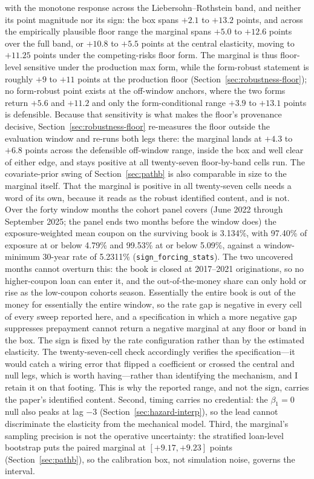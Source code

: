 \documentclass[12pt]{article}
\begin{document}
with the monotone response across the Liebersohn--Rothstein band, and neither its point magnitude nor its sign: the box spans $+2.1$ to $+13.2$ points, and across the empirically plausible floor range the marginal spans $+5.0$ to $+12.6$ points over the full band, or $+10.8$ to $+5.5$ points at the central elasticity, moving to $+11.25$ points under the competing-risks floor form. The marginal is thus floor-level sensitive under the production max form, while the form-robust statement is roughly $+9$ to $+11$ points at the production floor (Section~\ref{sec:robustness-floor}); no form-robust point exists at the off-window anchors, where the two forms return $+5.6$ and $+11.2$ and only the form-conditional range $+3.9$ to $+13.1$ points is defensible. Because that sensitivity is what makes the floor's provenance decisive, Section~\ref{sec:robustness-floor} re-measures the floor outside the evaluation window and re-runs both legs there: the marginal lands at $+4.3$ to $+6.8$ points across the defensible off-window range, inside the box and well clear of either edge, and stays positive at all twenty-seven floor-by-band cells run. The covariate-prior swing of Section~\ref{sec:pathb} is also comparable in size to the marginal itself. That the marginal is positive in all twenty-seven cells needs a word of its own, because it reads as the robust identified content, and is not. Over the forty window months the cohort panel covers (June 2022 through September 2025; the panel ends two months before the window does) the exposure-weighted mean coupon on the surviving book is 3.134\%, with 97.40\% of exposure at or below 4.79\% and 99.53\% at or below 5.09\%, against a window-minimum 30-year rate of 5.2311\% (\texttt{sign\_forcing\_stats}). The two uncovered months cannot overturn this: the book is closed at 2017--2021 originations, so no higher-coupon loan can enter it, and the out-of-the-money share can only hold or rise as the low-coupon cohorts season. Essentially the entire book is out of the money for essentially the entire window, so the rate gap is negative in every cell of every sweep reported here, and a specification in which a more negative gap suppresses prepayment cannot return a negative marginal at any floor or band in the box. The sign is fixed by the rate configuration rather than by the estimated elasticity. The twenty-seven-cell check accordingly verifies the specification---it would catch a wiring error that flipped a coefficient or crossed the central and null legs, which is worth having---rather than identifying the mechanism, and I retain it on that footing. This is why the reported range, and not the sign, carries the paper's identified content. Second, timing carries no credential: the $\beta_1 = 0$ null also peaks at lag $-3$ (Section~\ref{sec:hazard-interp}), so the lead cannot discriminate the elasticity from the mechanical model. Third, the marginal's sampling precision is not the operative uncertainty: the stratified loan-level bootstrap puts the paired marginal at $[+9.17, +9.23]$ points (Section~\ref{sec:pathb}), so the calibration box, not simulation noise, governs the interval.
\end{document}
